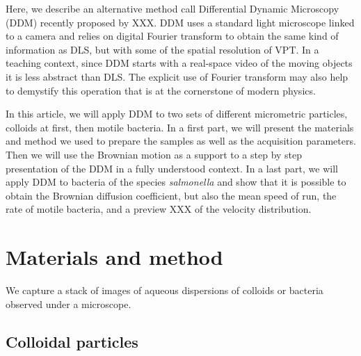 \documentclass[%
 aip,
 jmp,%
 amsmath,amssymb,
reprint,%
]{revtex4-1}
\begin{document}

 

Here, we describe an alternative method call Differential Dynamic Microscopy (DDM) recently proposed by XXX. DDM uses a standard light microscope linked to a camera and relies on digital Fourier transform to obtain the same kind of information as DLS, but with some of the spatial resolution of VPT. In a teaching context, since DDM starts with a real-space video of the moving objects it is less abstract than DLS. The explicit use of Fourier transform may also help to demystify this operation that is at the cornerstone of modern physics. 

In this article, we will apply DDM to two sets of different micrometric particles, colloids at first, then motile bacteria. In a first part, we will present the materials and method we used to prepare the samples as well as the acquisition parameters. Then we will use the Brownian motion as a support to a step by step presentation of the DDM in a fully understood context. In a last part, we will apply DDM to bacteria of the species \textit{salmonella} and show that it is possible to obtain the Brownian diffusion coefficient, but also the mean speed of run, the rate of motile bacteria, and a preview XXX of the velocity distribution.

\section{Materials and method}

We capture a stack of images of aqueous dispersions of colloids or bacteria observed under a microscope.

\subsection{Colloidal particles}
\end{document}

